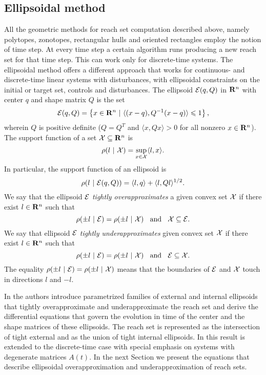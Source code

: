 \subsection{Ellipsoidal method}\label{subsec_ellipsoids}
All the geometric methods for reach set computation described above,
namely polytopes, zonotopes, rectangular hulls and oriented rectangles
employ the notion of time step.
At every time step a certain algorithm runs producing a new reach set
for that time step.
This can work only for discrete-time systems.  The
ellipsoidal method  offers a different approach that works
for continuous- and discrete-time linear systems with disturbances,
with ellipsoidal constraints on the initial or target set, controls
and disturbances.
\bd[Ellipsoid]
The ellipsoid $\EE(q,Q)$ in ${\bf R}^n$ with  center $q$
and  shape matrix $Q$ is the set
\[\EE(q,Q) = \left\{ x \in {\bf R}^n
~|~ \langle (x-q), Q^{-1}(x-q)\rangle\leq1 \right\}, \]
wherein  $Q$ is positive definite ($Q=Q^T$ and $\langle x, Qx\rangle>0$
for all nonzero $x\in{\bf R}^n$).
\label{def_ellipsoid}
\ed
{}
The support function of a set $\XX\subseteq{\bf R}^n$ is
\[ \rho(l~|~\XX) = \sup_{x\in\XX} \langle l,x\rangle. \]
\label{def_supportfunction}
\ed
In particular, the support function of an ellipsoid is
\begin{equation}
\rho(l~|~\EE(q,Q)) = \langle l, q\rangle + \langle l, Ql\rangle^{1/2}.
\label{ellsupportfunction}
\end{equation}
We say that the ellipsoid $\EE$ \emph{tightly overapproximates} a
given convex set $\XX$ if there exist $l\in{\bf R}^n$ such that
\[ \rho(\pm l ~|~ \EE) = \rho(\pm l ~|~ \XX) \;\; \mbox{ and } \;\;
\XX \subseteq \EE. \]
We say that ellipsoid $\EE$ \emph{tightly underapproximates}
given convex set $\XX$ if there exist $l\in{\bf R}^n$ such that
\[ \rho(\pm l ~|~ \EE) = \rho(\pm l ~|~ \XX) \;\; \mbox{ and } \;\;
\EE \subseteq \XX. \]
The equality $\rho(\pm l ~|~ \EE) = \rho(\pm l ~|~ \XX)$ means that the
boundaries of $\EE$ and $\XX$ touch in directions $l$ and $-l$.

In \cite{kurvar00} the authors introduce parametrized families of external
and internal ellipsoids that tightly overapproximate and underapproximate
the reach set and derive the differential equations that
govern the evolution in time of the center and the shape matrices of
these ellipsoids.
The reach set is represented as the intersection of tight external
and as the union of tight internal ellipsoids.
In \cite{kurvar07} this result is extended to the discrete-time case
with special emphasis on systems with degenerate matrices $A(t)$.
In the next Section we present the equations that describe ellipsoidal
overapproximation and underapproximation of reach sets.

